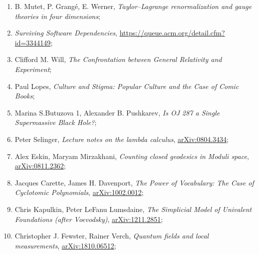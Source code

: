 \documentclass[a4paper,11pt]{article}
\begin{document}
\begin{enumerate}
\item B. Mutet, P. Grang\'{e}, E. Werner, \textit{Taylor–Lagrange
    renormalization and gauge theories in four dimensions};



\item \textit{Surviving Software Dependencies},
  \href{https://queue.acm.org/detail.cfm?id=3344149}{https://queue.acm.org/detail.cfm?id=3344149};



\item Clifford M. Will, \textit{The Confrontation between General
    Relativity and Experiment};



\item Paul Lopes, \textit{Culture and Stigma: Popular Culture and the
    Case of Comic Books};



\item Marina S.Butuzova 1, Alexander B. Pushkarev, \textit{Is OJ 287 a
    Single Supermassive Black Hole?};



\item Peter Selinger, \textit{Lecture notes on the lambda calculus},
  \href{https://arxiv.org/abs/0804.3434v2}{arXiv:0804.3434};



\item Alex Eskin, Maryam Mirzakhani, \textit{Counting closed geodesics
    in Moduli space},
  \href{https://arxiv.org/abs/0811.2362v3}{arXiv:0811.2362};



\item Jacques Carette, James H. Davenport, \textit{The Power of
    Vocabulary: The Case of Cyclotomic Polynomials},
  \href{https://arxiv.org/abs/1002.0012v1}{arXiv:1002.0012};



\item Chris Kapulkin, Peter LeFanu Lumsdaine, \textit{The Simplicial
    Model of Univalent Foundations (after Voevodsky)},
  \href{https://arxiv.org/abs/1211.2851v5}{arXiv:1211.2851};



\item Christopher J. Fewster, Rainer Verch, \textit{Quantum fields and
    local measurements},
  \href{https://arxiv.org/abs/1810.06512}{arXiv:1810.06512};




\end{enumerate}
\end{document}
